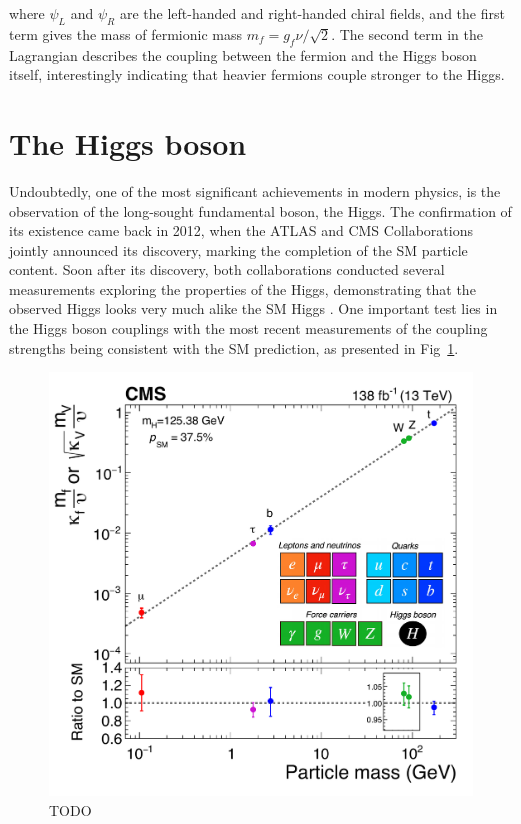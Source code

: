 where $\psi_L$ and $\psi_R$ are the left-handed and right-handed chiral fields, and the first term gives the mass of fermionic mass $m_f = g_f\nu / \sqrt{2}$. The second term in the Lagrangian describes the coupling between the fermion and the Higgs boson itself, interestingly indicating that heavier fermions couple stronger to the Higgs.

\section{The Higgs boson}

Undoubtedly, one of the most significant achievements in modern physics, is the observation of the long-sought fundamental boson, the Higgs. The confirmation of its existence came back in 2012, when the ATLAS and CMS Collaborations \cite{Higgs_ATLAS,Higgs_CMS} jointly announced its discovery, marking the completion of the SM particle content. Soon after its discovery, both collaborations conducted several measurements exploring the properties of the Higgs, demonstrating that the observed Higgs looks very much alike the SM Higgs \cite{HiggsParity_1,HiggsParity_2}. One important test lies in the Higgs boson couplings with the most recent measurements of the coupling strengths \cite{CMS_Couplings_Measurement} being consistent with the SM prediction, as presented in Fig~\ref{Fig:Introduction_CMScouplings}.

\begin{figure}[h]
\centering
\includegraphics[width= .7\textwidth]{Figures/Introduction/CMS_Higgs_FermionCouplings.pdf}
\caption{TODO \cite{CMS_Couplings_Measurement}}\label{Fig:Introduction_CMScouplings}
\end{figure}

